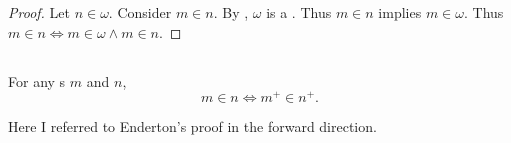 \documentclass{report}
\begin{document}
  \begin{proof}
    Let $n \in \omega$.
    Consider $m \in n$.
    By , $\omega$ is a .
    Thus $m \in n$ implies $m \in \omega$.
    Thus $m \in n \iff m \in \omega \land m \in n$.
  \end{proof}

\subsection{}%

  \begin{lemma}[4L(a)]
    For any s $m$ and $n$,
      $$m \in n \iff m^+ \in n^+.$$
  \end{lemma}


  \begin{note}
    Here I referred to Enderton's proof in the forward direction.
  \end{note}
\end{document}
